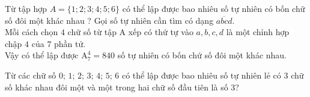 \begin{bt}%
    Từ tập hợp $A=\{1 ; 2 ; 3 ; 4 ; 5 ; 6\}$ có thể lập được bao nhiêu số tự nhiên có bốn chữ số đôi một khác nhau ?
    \loigiai
    {
        Gọi số tự nhiên cần tìm có dạng $ \overline{abcd} $.\\
        Mỗi cách chọn $ 4 $ chữ số từ tập A xếp có thứ tự vào $ a,b,c,d $ là một chỉnh hợp chập $ 4 $ của $ 7 $ phần tử.\\
        Vậy có thể lập được $ \mathrm{A}_7^4=840 $ số tự nhiên có bốn chứ số đôi một khác nhau.
    }
\end{bt}

\begin{bt}%
Từ các chữ số $0;\,1;\,2;\,3;\,4;\,5;\,6$ có thể lập được bao nhiêu số tự nhiên lẻ có $3$ chữ số khác nhau đôi một và một trong hai chữ số đầu tiên là số $3$?
\end{bt}

